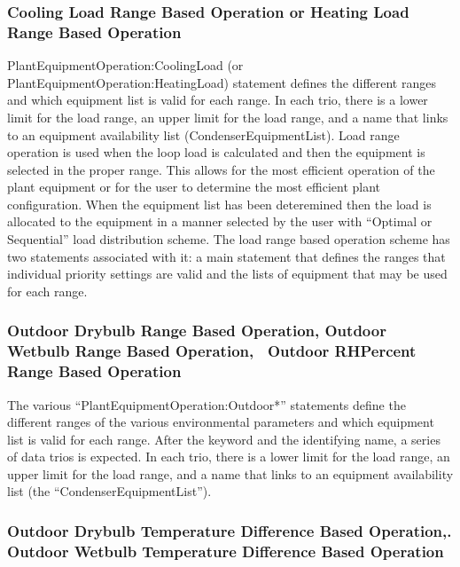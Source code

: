 \subsubsection{Cooling Load Range Based Operation or Heating Load Range Based Operation}\label{cooling-load-range-based-operation-or-heating-load-range-based-operation-1}

PlantEquipmentOperation:CoolingLoad (or PlantEquipmentOperation:HeatingLoad) statement defines the different ranges and which equipment list is valid for each range. In each trio, there is a lower limit for the load range, an upper limit for the load range, and a name that links to an equipment availability list (CondenserEquipmentList). Load range operation is used when the loop load is calculated and then the equipment is selected in the proper range. This allows for the most efficient operation of the plant equipment or for the user to determine the most efficient plant configuration. When the equipment list has been deteremined then the load is allocated to the equipment in a manner selected by the user with ``Optimal or Sequential'' load distribution scheme. The load range based operation scheme has two statements associated with it: a main statement that defines the ranges that individual priority settings are valid and the lists of equipment that may be used for each range.

\subsubsection{Outdoor Drybulb Range Based Operation, Outdoor Wetbulb Range Based Operation,~ Outdoor RHPercent Range Based Operation}\label{outdoor-drybulb-range-based-operation-outdoor-wetbulb-range-based-operation-outdoor-rhpercent-range-based-operation}

The various ``PlantEquipmentOperation:Outdoor*'' statements define the different ranges of the various environmental parameters and which equipment list is valid for each range. After the keyword and the identifying name, a series of data trios is expected. In each trio, there is a lower limit for the load range, an upper limit for the load range, and a name that links to an equipment availability list (the ``CondenserEquipmentList'').

\subsubsection{Outdoor Drybulb Temperature Difference Based Operation,. Outdoor Wetbulb Temperature Difference Based Operation}\label{outdoor-drybulb-temperature-difference-based-operation.-outdoor-wetbulb-temperature-difference-based-operation}

